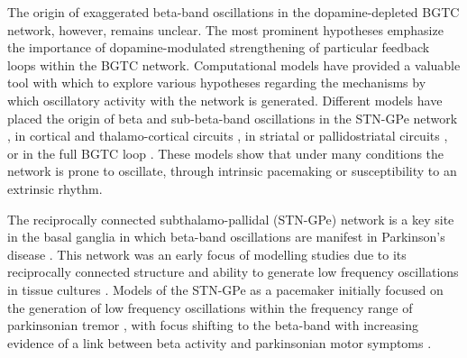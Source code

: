 %
The origin of exaggerated beta-band oscillations in the dopamine-depleted BGTC network,
however, remains unclear.
The most prominent hypotheses emphasize the importance of dopamine-modulated strengthening
of particular feedback loops within the BGTC network. Computational models have provided
a valuable tool with which to explore various hypotheses regarding the mechanisms by which
oscillatory activity with the network is generated. Different models have placed the origin
of beta and sub-beta-band oscillations in the STN-GPe network \cite{terman_activity_2002,gillies_neuroinformatics_2007,holgado_conditions_2010,pavlides_improved_2012},
in cortical and thalamo-cortical circuits \cite{sherman_neural_2016,reis_thalamocortical_2019,pavlides_computational_2015,liu_neural_2017},
in striatal or pallidostriatal circuits \cite{mccarthy_striatal_2011,corbit_pallidostriatal_2016,damodaran_desynchronization_2015},
or in the full BGTC loop \cite{pavlides_computational_2015,kumaravelu_biophysical_2016,leblois_competition_2006,kang_interaction_2013}.
These models show that under many conditions the network is prone to oscillate,
through intrinsic pacemaking or susceptibility to an extrinsic rhythm.
%
%
%
%

%
The reciprocally connected subthalamo-pallidal (STN-GPe) network is a key site
in the basal ganglia in which beta-band oscillations are manifest in Parkinson's disease \cite{mallet_parkinsonian_2008,mallet_disrupted_2008}. This network was an early focus
of modelling studies due to its reciprocally connected structure and ability to generate
low frequency oscillations in tissue cultures \cite{plenz_basal_1999}. Models of the STN-GPe
as a pacemaker initially focused on the generation of low frequency oscillations within the
frequency range of parkinsonian tremor \cite{gillies_subthalamic-pallidal_2002,terman_activity_2002},
with focus shifting to the beta-band with increasing evidence of a link between beta activity and
parkinsonian motor symptoms \cite{holgado_conditions_2010,pavlides_improved_2012}.

